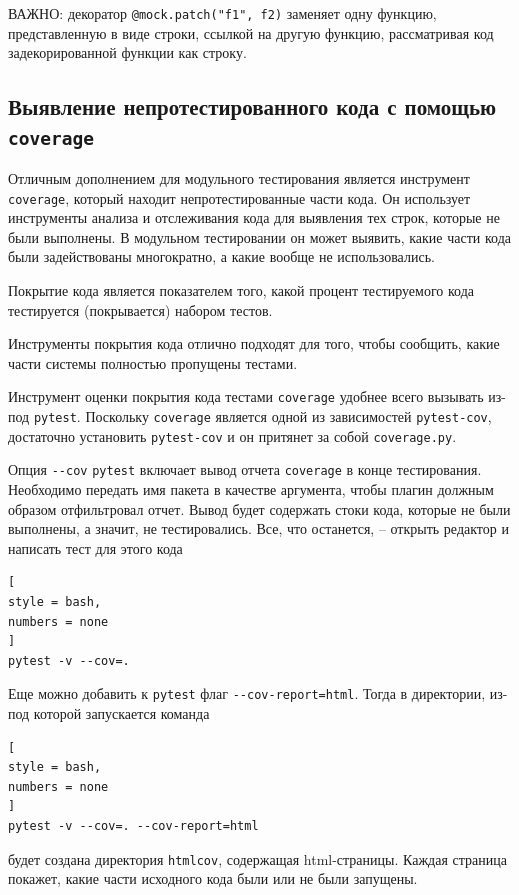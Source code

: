 \documentclass[%
	11pt,
	a4paper,
	utf8,
		]{article}
\begin{document}
ВАЖНО: декоратор \verb|@mock.patch("f1", f2)| заменяет одну функцию, представленную в виде строки, ссылкой на другую функцию, рассматривая код задекорированной функции как строку.

\subsection{Выявление непротестированного кода с помощью \texttt{coverage}}

Отличным дополнением для модульного тестирования является инструмент  \texttt{coverage}, который находит непротестированные части кода. Он использует инструменты анализа и отслеживания кода для выявления тех строк, которые не были выполнены. В модульном тестировании он может выявить, какие части кода были задействованы многократно, а какие вообще не использовались. 

Покрытие кода является показателем того, какой процент тестируемого кода тестируется (покрывается) набором тестов.

Инструменты покрытия кода отлично подходят для того, чтобы сообщить, какие части системы полностью пропущены тестами.

Инструмент оценки покрытия кода тестами \texttt{coverage} удобнее всего вызывать из-под \texttt{pytest}. Поскольку \texttt{coverage} является одной из зависимостей \texttt{pytest-cov}, достаточно установить \texttt{pytest-cov} и он притянет за собой \texttt{coverage.py}.

Опция \verb|--cov| \texttt{pytest} включает вывод отчета \texttt{coverage} в конце тестирования. Необходимо передать имя пакета в качестве аргумента, чтобы плагин должным образом отфильтровал отчет. Вывод будет содержать стоки кода, которые не были выполнены, а значит, не тестировались. Все, что останется, -- открыть редактор и написать тест для этого кода
\begin{lstlisting}[
style = bash,
numbers = none	
]
pytest -v --cov=.
\end{lstlisting}

Еще можно добавить к \texttt{pytest} флаг \verb|--cov-report=html|. Тогда в директории, из-под которой запускается команда
\begin{lstlisting}[
style = bash,
numbers = none	
]
pytest -v --cov=. --cov-report=html
\end{lstlisting}
будет создана директория \texttt{htmlcov}, содержащая html-страницы. Каждая страница покажет, какие части исходного кода были или не были запущены.
\end{document}
